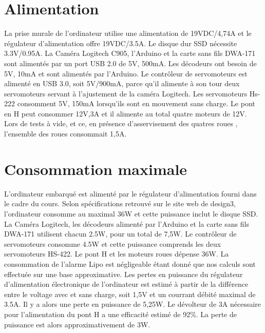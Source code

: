 \section{Alimentation}
  La prise murale de l'ordinateur utilise une alimentation de 19VDC/4,74A et le régulateur d’alimentation offre 19VDC/3.5A. Le disque dur SSD nécessite 3.3V/0.95A. La Caméra Logitech C905, l’Arduino et la carte sans fils DWA-171 sont alimentés par un port USB 2.0 de 5V, 500mA. Les décodeurs ont besoin de 5V, 10mA et sont alimentés par l’Arduino. Le contrôleur de servomoteurs est alimenté en USB 3.0, soit 5V/900mA, parce qu'il alimente à son tour deux servomoteurs servant à l'ajustement de la caméra Logitech. Les servomoteurs Hs-222 consomment 5V, 150mA lorsqu’ils sont en mouvement sans charge. Le pont en H peut consommer 12V,3A et il alimente au total quatre moteurs de 12V. Lors de tests à vide, et ce, en présence d'asservisement des quatres roues , l'ensemble des roues consommait 1,5A. 

\section{Consommation maximale}

L’ordinateur embarqué est alimenté par le régulateur d'alimentation fourni dans le cadre du cours. Selon spécifications retrouvé sur le site web de design3, l'ordinateur consomme au maximal 36W et cette puissance inclut le disque SSD. La Caméra Logitech, les décodeurs alimenté par l’Arduino et la carte sans fils DWA-171 utilisent chacun 2.5W, pour un total de 7,5W. Le contrôleur de servomoteurs consomme 4.5W et cette puissance comprends les deux servomoteurs HS-422. Le pont H et les moteurs roues dépense 36W. La consommation de l’alarme Lipo est négligeable étant donné que nos calculs sont effectuée sur une base approximative. Les pertes en puissance du régulateur d'alimentation électronique de l'ordinateur est estimé à partir de la différence entre le voltage avec et sans charge, soit 1,5V et un courrant débité maximal de 3.5A. Il y a alors une perte en puissance de 5,25W. Le dévolteur de 3A nécessaire pour l'alimentation du pont H a une efficacité estimé de 92\%. La perte de puissance est alors approximativement de 3W.

